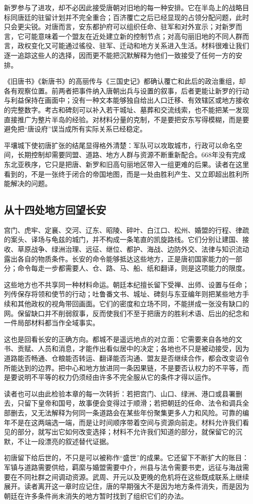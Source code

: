 新罗参与了进攻，却不必因此接受唐朝对旧地的每一种安排。它在半岛上的战略目标同唐廷的驻留计划并不完全重合；百济覆亡之后已经显现的占领分配问题，此时只会更尖锐。对唐而言，安东都护府可以组织任命、驻军和对外宣示；对新罗而言，它可能意味着一个盟友在近处建立新的控制节点；对高句丽旧地的不同人群而言，政权变化又可能通过徭役、驻军、迁动和地方关系进入生活。材料很难让我们逐一追踪这些人的选择，因而更不能把沉默解释为他们一致接受了任何一方的安排。

《旧唐书》《新唐书》的高丽传与《三国史记》都确认覆亡和此后的政治重组，却各有观察位置。前两者把事件纳入唐朝出兵与设置的叙事，后者更能让新罗的行动与利益保持在画面中；没有一种文本能够独自给出人口迁移、有效辖区或地方接收的完整数字。考古和碑刻可以补入若干城址、墓葬和交流线索，也不能把某一发现直接推广为整片半岛的经验。对材料分量的克制，不是要把安东写得模糊，而是要避免把“唐设府”误当成所有实际关系已经稳定。

平壤城下使初唐扩张的结尾显得格外清楚：军队可以攻取城市，行政可以命名空间，长期控制却需要同盟、道路、地方人群与资源不断重新配合。668年没有完成东北亚秩序，它只是把唐、新罗和旧高句丽地区带入一组更难的后果。读者在这里看到的，不是一张终于闭合的帝国地图，而是一处由胜利产生、又立即超出胜利所能解决的问题。

\subsection{从十四处地方回望长安}
宫门、虎牢、定襄、交河、辽东、昭陵、碎叶、白江口、松州、婚盟的行程、律疏的案头、译场与龟兹的城门，并不构成一条笔直的凯旋路线。它们分别让建国、接收、草原战争、绿洲治理、远征、继位、都护、海战、边防外交、法律与知识流动露出各自的物质条件。长安的命令能够抵达这些地方，正是唐初国家能力的一部分；命令每走一步都需要人、仓、路、马、船、纸和翻译，则是这项能力的限度。

这些地方也不共享同一种材料命运。朝廷本纪擅长留下受禅、出师、设置与任命；列传保存将领和使节的行动；吐鲁番文书、城址、碑刻与东亚编年则把某些地方手续和其他政权的视角带回画面。它们的密度和立场不同，不能拼成一张没有缺口的网。保留缺口并不削弱叙事，反而使我们不至于把唐方的胜利术语、后出的纪念和一件局部材料都当作全域事实。

这也是回看长安的正确方向。都城不是遥远地点的对立面：它需要来自各地的文书、贡赋、人员和消息，才能作出看似居中的决定；各地也不只是被动接受，因为道路能否畅通、仓粮能否转运、翻译能否沟通、盟友是否继续合作，都会改变诏令所能达到的边界。把中心和地方放进同一条因果链，不是要否认权力的不平等，而是要说明不平等的权力仍须经由许多不完全服从它的条件才得以运作。

读者也可以由此检验本章的每一次转折：若把宫门、山口、绿洲、港口或县署删去，只留下皇帝和国号，故事便会变得过于顺滑；若把朝廷的任命、法令和调兵全部删去，又无法解释为何同一条道路会在某些年份聚集更多人力和风险。可靠的编年不是在这两端选一端，而是让时间顺序带着空间与资源向前走。材料允许我们看见的部分，就写出它如何改变选择；材料不允许我们知道的部分，就保留它的沉默，不让一段漂亮的叙述替代证据。

初唐留下给后世的，不只是可以被称作“盛世”的成果。它还留下不断扩大的账目：军镇与道路需要供给，羁縻与婚盟需要中介，州县与法令需要书吏，远征与海战需要在不同社群之间调动资源。武周、开元以及更晚的危机将在这些既成联系上继续展开。读者离开这一章时应记住，唐的早期强大不是因为地方条件消失，而是因为朝廷在许多条件尚未消失的地方暂时找到了组织它们的办法。
